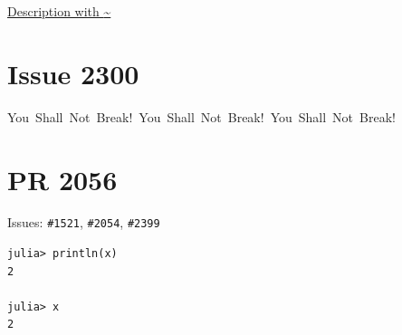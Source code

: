\label{6190121468141467671}{}


\href{https://link.with/~tilde}{Description with {\textasciitilde}}



\section{Issue 2300}



\label{2544901485667472756}{}


You~Shall~Not~Break!~You~Shall~Not~Break!~You~Shall~Not~Break!



\section{PR 2056}



\label{13699755364361795477}{}


Issues: \texttt{\#1521}, \texttt{\#2054}, \texttt{\#2399}




\begin{verbatim}
julia> println(x)
2

julia> x
2
\end{verbatim}




